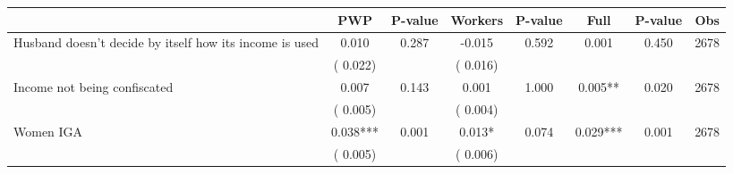
\begin{tabular}{l*{7}{c}}\hline&\multicolumn{1}{c}{PWP}&\multicolumn{1}{c}{P-value}&\multicolumn{1}{c}{Workers}&\multicolumn{1}{c}{P-value}&\multicolumn{1}{c}{Full}&\multicolumn{1}{c}{P-value}&\multicolumn{1}{c}{Obs} \\ \hline

 Husband doesn't decide by itself how its income is used       &              0.010       &        0.287  &             -0.015       &        0.592  &              0.001       &              0.450 &  2678 \\ 
                       &       (       0.022)             &                               &       (       0.016)                     &                               &                                               &                                &                      \\ 

 Income not being confiscated       &              0.007       &        0.143  &              0.001       &        1.000  &              0.005**       &              0.020 &  2678 \\ 
                       &       (       0.005)             &                               &       (       0.004)                     &                               &                                               &                                &                      \\ 

 Women IGA       &              0.038***       &        0.001  &              0.013*       &        0.074  &              0.029***       &              0.001 &  2678 \\ 
                       &       (       0.005)             &                               &       (       0.006)                     &                               &                                               &                                &                      \\ 

\hline \end{tabular}